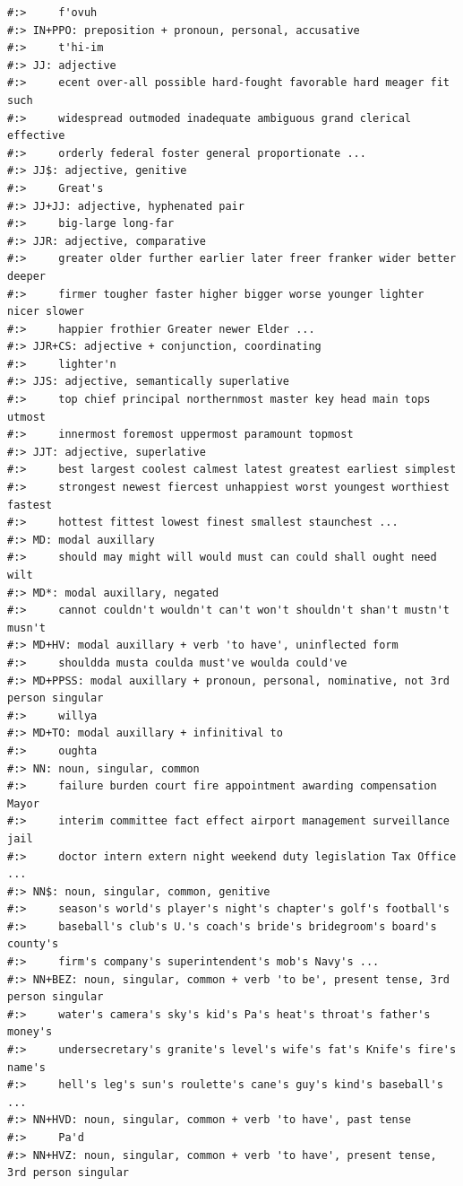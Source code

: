 \documentclass[
]{book}
\begin{document}
\begin{verbatim}
#:>     f'ovuh
#:> IN+PPO: preposition + pronoun, personal, accusative
#:>     t'hi-im
#:> JJ: adjective
#:>     ecent over-all possible hard-fought favorable hard meager fit such
#:>     widespread outmoded inadequate ambiguous grand clerical effective
#:>     orderly federal foster general proportionate ...
#:> JJ$: adjective, genitive
#:>     Great's
#:> JJ+JJ: adjective, hyphenated pair
#:>     big-large long-far
#:> JJR: adjective, comparative
#:>     greater older further earlier later freer franker wider better deeper
#:>     firmer tougher faster higher bigger worse younger lighter nicer slower
#:>     happier frothier Greater newer Elder ...
#:> JJR+CS: adjective + conjunction, coordinating
#:>     lighter'n
#:> JJS: adjective, semantically superlative
#:>     top chief principal northernmost master key head main tops utmost
#:>     innermost foremost uppermost paramount topmost
#:> JJT: adjective, superlative
#:>     best largest coolest calmest latest greatest earliest simplest
#:>     strongest newest fiercest unhappiest worst youngest worthiest fastest
#:>     hottest fittest lowest finest smallest staunchest ...
#:> MD: modal auxillary
#:>     should may might will would must can could shall ought need wilt
#:> MD*: modal auxillary, negated
#:>     cannot couldn't wouldn't can't won't shouldn't shan't mustn't musn't
#:> MD+HV: modal auxillary + verb 'to have', uninflected form
#:>     shouldda musta coulda must've woulda could've
#:> MD+PPSS: modal auxillary + pronoun, personal, nominative, not 3rd person singular
#:>     willya
#:> MD+TO: modal auxillary + infinitival to
#:>     oughta
#:> NN: noun, singular, common
#:>     failure burden court fire appointment awarding compensation Mayor
#:>     interim committee fact effect airport management surveillance jail
#:>     doctor intern extern night weekend duty legislation Tax Office ...
#:> NN$: noun, singular, common, genitive
#:>     season's world's player's night's chapter's golf's football's
#:>     baseball's club's U.'s coach's bride's bridegroom's board's county's
#:>     firm's company's superintendent's mob's Navy's ...
#:> NN+BEZ: noun, singular, common + verb 'to be', present tense, 3rd person singular
#:>     water's camera's sky's kid's Pa's heat's throat's father's money's
#:>     undersecretary's granite's level's wife's fat's Knife's fire's name's
#:>     hell's leg's sun's roulette's cane's guy's kind's baseball's ...
#:> NN+HVD: noun, singular, common + verb 'to have', past tense
#:>     Pa'd
#:> NN+HVZ: noun, singular, common + verb 'to have', present tense, 3rd person singular

\end{verbatim}
\end{document}
